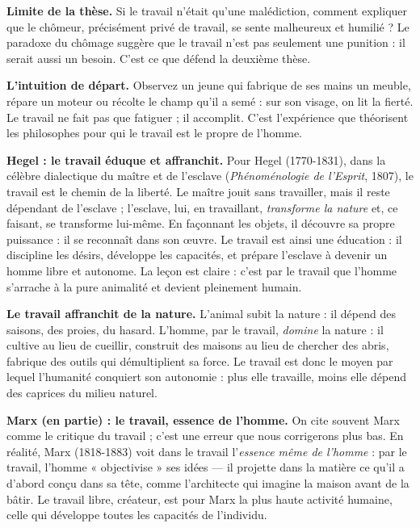 \documentclass[11pt]{article}
\newcommand{\cle}[1]{{\popxbold\color{popdark}#1}}
\newcounter{popsec}
\newcounter{popsub}
\newcommand{\courssub}[1]{%
  \stepcounter{popsub}%
  \par\vspace{9pt}\noindent{\popxbold\fontsize{11.5}{13}\selectfont\color{popink}{\color{poporange}\thepopsec.\thepopsub}\hspace{6pt}#1}\par\nopagebreak\vspace{4pt}
}
\begin{document}
\textbf{Limite de la thèse.} Si le travail n'était qu'une malédiction, comment expliquer que le chômeur, précisément privé de travail, se sente malheureux et humilié ? Le paradoxe du chômage suggère que le travail n'est pas seulement une punition : il serait aussi un besoin. C'est ce que défend la deuxième thèse.

\courssub{Deuxième thèse : le travail comme libération}

\textbf{L'intuition de départ.} Observez un jeune qui fabrique de ses mains un meuble, répare un moteur ou récolte le champ qu'il a semé : sur son visage, on lit la fierté. Le travail ne fait pas que fatiguer ; il accomplit. C'est l'expérience que théorisent les philosophes pour qui le travail est le propre de l'homme.

\textbf{Hegel : le travail éduque et affranchit.} Pour \cle{Hegel} (1770-1831), dans la célèbre dialectique du maître et de l'esclave (\emph{Phénoménologie de l'Esprit}, 1807), le travail est le chemin de la liberté. Le maître jouit sans travailler, mais il reste dépendant de l'esclave ; l'esclave, lui, en travaillant, \emph{transforme la nature} et, ce faisant, se transforme lui-même. En façonnant les objets, il découvre sa propre puissance : il se reconnaît dans son œuvre. Le travail est ainsi une \cle{éducation} : il discipline les désirs, développe les capacités, et prépare l'esclave à devenir un homme libre et autonome. La leçon est claire : c'est par le travail que l'homme s'arrache à la pure animalité et devient pleinement humain.

\textbf{Le travail affranchit de la nature.} L'animal subit la nature : il dépend des saisons, des proies, du hasard. L'homme, par le travail, \emph{domine} la nature : il cultive au lieu de cueillir, construit des maisons au lieu de chercher des abris, fabrique des outils qui démultiplient sa force. Le travail est donc le moyen par lequel l'humanité conquiert son \cle{autonomie} : plus elle travaille, moins elle dépend des caprices du milieu naturel.

\textbf{Marx (en partie) : le travail, essence de l'homme.} On cite souvent Marx comme le critique du travail ; c'est une erreur que nous corrigerons plus bas. En réalité, \cle{Marx} (1818-1883) voit dans le travail l'\emph{essence même de l'homme} : par le travail, l'homme « objectivise » ses idées — il projette dans la matière ce qu'il a d'abord conçu dans sa tête, comme l'architecte qui imagine la maison avant de la bâtir. Le travail libre, créateur, est pour Marx la plus haute activité humaine, celle qui développe toutes les capacités de l'individu.
\end{document}
